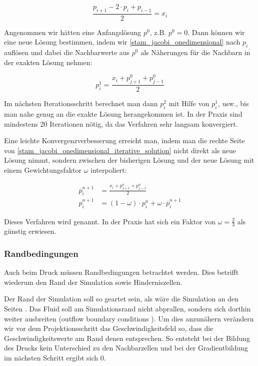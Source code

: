 \begin{equation}
\label{stam_jacobi_onedimensional}
\frac{
	p_{i+1} -
	2 \cdot p_{i} +
	p_{i-1}
}
{
	2
}
=
x_i
\end{equation}

Angenommen wir hätten eine Anfangslösung $p^0$, z.B.
$p^0 = 0$. Dann können wir eine neue Lösung bestimmen,
indem wir \autoref{stam_jacobi_onedimensional} nach $p_i$ auflösen und dabei die
Nachbarwerte aus $p^0$ als Näherungen für die Nachbarn
in der exakten Lösung nehmen:

\begin{equation}
\label{stam_jacobi_onedimensional_iterative_solution}
p_i^1
=
\frac{
	x_i + p_{j+1}^{0} + p_{j-1}^{0}
}
{
	2
}
\end{equation}

Im nächsten Iterationsschritt berechnet man dann $p_i^2$ mit Hilfe von $p_i^1$,
usw., bis man nahe genug an die exakte Lösung herangekommen ist. In der Praxis
sind mindestens 20 Iterationen nötig, da das Verfahren sehr langsam konvergiert.

Eine leichte Konvergenzverbesserung erreicht man, indem man die rechte Seite von
\autoref{stam_jacobi_onedimensional_iterative_solution} nicht direkt als neue
Lösung nimmt, sondern zwischen der bisherigen Lösung und der neue Lösung mit
einem Gewichtungsfaktor $\omega$ interpoliert:

\begin{align}
\overline{p}_i^{n+1}
&=
\frac{
	x_i + p_{j+1}^{n} + p_{j-1}^{n}
}
{
	2
} \\
p_i^{n+1}
&=
(1-\omega) \cdot p_i^n + \omega \cdot \overline{p}_i^{n+1}
\end{align}

Dieses Verfahren wird  genannt. In
der Praxis hat sich ein Faktor von $\omega=\frac{2}{3}$ als günstig erwiesen.

\subsubsection{Randbedingungen}

Auch beim Druck müssen Randbedingungen betrachtet werden. Dies betrifft wiederum
den Rand der Simulation sowie Hinderniszellen.

Der Rand der Simulation soll so geartet sein, als wäre die Simulation an den
Seiten . Das Fluid soll am Simulationsrand nicht abprallen,
sondern sich dorthin weiter ausbreiten (outflow boundary conditions
). Um dies anzunähern verändern wir vor
dem Projektionsschritt das Geschwindigkeitsfeld so, dass die
Geschwindigkeitswerte am Rand denen  entsprechen.
So entsteht bei der Bildung des Drucks kein Unterschied zu den Nachbarzellen und
bei der Gradientbildung im nächsten Schritt ergibt sich $0$.

